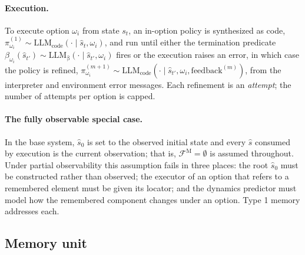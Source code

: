 \documentclass[11pt]{article}
\newcommand{\llm}[1]{\mathrm{LLM}_{\mathrm{#1}}}
\newcommand{\calF}{\mathcal{F}}
\newcommand{\shat}{\hat{s}}
\newcommand{\FM}{\calF^{\mathrm{M}}}
\begin{document}
\paragraph{Execution.}
To execute option $\omega_i$ from state $s_{t}$, an in-option policy is synthesized as code, $\pi^{(1)}_{\omega_i}\sim\llm{code}(\cdot\mid\shat_t,\omega_i)$, and run until either the termination predicate $\beta_{\omega_i}(\shat_{t'})\sim\llm{\beta}(\cdot\mid\shat_{t'},\omega_i)$ fires or the execution raises an error, in which case the policy is refined, $\pi^{(m+1)}_{\omega_i}\sim\llm{code}(\cdot\mid\shat_{t'},\omega_i,\mathrm{feedback}^{(m)})$, from the interpreter and environment error messages. Each refinement is an \emph{attempt}; the number of attempts per option is capped.

\paragraph{The fully observable special case.}
In the base system, $\shat_0$ is set to the observed initial state and every $\shat$ consumed by execution is the current observation; that is, $\FM=\emptyset$ is assumed throughout. Under partial observability this assumption fails in three places: the root $\shat_0$ must be constructed rather than observed; the executor of an option that refers to a remembered element must be given its locator; and the dynamics predictor must model how the remembered component changes under an option. Type 1 memory addresses each.

\subsection{Memory unit}
\label{sec:type1-unit}
\end{document}
